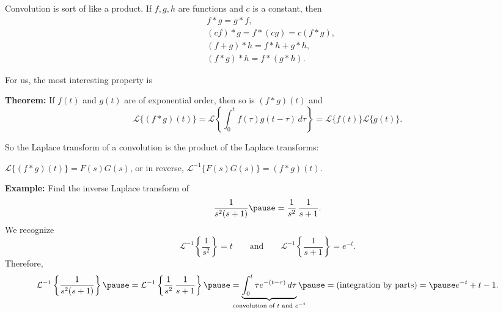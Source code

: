 \documentclass[10pt,aspectratio=169]{beamer}
\begin{document}
\begin{frame}
Convolution is sort of like a product.  If $f,g,h$ are functions and $c$
is a constant, then
\begin{align*}
& f * g = g * f , \\
& (c f) * g = f * (c g) = c (f*g) , \\
& (f+g) * h = f * h + g * h , \\
& ( f * g ) * h = f * ( g * h ) .
\end{align*}


\medskip
\pause

For us, the most
interesting property is

\medskip

\textbf{Theorem:}
If $f(t)$ and $g(t)$ are of exponential order, then
so is $(f*g)(t)$ and
\begin{equation*}
\mathcal{L} \bigl\{ (f*g)(t) \bigr\}
=
\mathcal{L} \left\{ \int_0^t f(\tau) g(t-\tau) \, d\tau \right\}
=
\mathcal{L} \bigl\{ f(t) \bigr\} \mathcal{L} \bigl\{ g(t) \bigr\} .
\end{equation*}

\medskip
\pause

So the Laplace transform of a convolution is the product
of the Laplace transforms:

\medskip
\qquad
${\mathcal{L}} \bigl\{ (f*g)(t) \bigr\} = F(s)G(s)$,
\pause
\qquad
or in reverse,
\qquad
${\mathcal{L}}^{-1} \bigl\{ F(s) G(s) \bigr\} = (f*g)(t)$.



\end{frame}

\begin{frame}
\textbf{Example:}
Find the inverse Laplace transform of
\[
\frac{1}{s^2 (s+1)} \pause = 
\frac{1}{s^2}
\,
\frac{1}{s+1}
.
\]
\pause
We recognize
\[
\mathcal{L}^{-1} 
\left\{
\frac{1}{s^2} \right\} 
= t
\qquad \text{and} \qquad
\mathcal{L}^{-1} 
\left\{
\frac{1}{s+1} \right\}
= e^{-t} .
\]
\pause
Therefore,
\[
\mathcal{L}^{-1}
\left\{
\frac{1}{s^2(s+1)}
\right\}
\pause
=
\mathcal{L}^{-1}
\left\{
\frac{1}{s^2}
\,
\frac{1}{s+1}
\right\}
\pause
=
\underbrace{
\int_0^t
\tau e^{-(t-\tau)} \,d\tau
}_{\mathclap{\text{convolution of } t \text{ and } e^{-t}}}
\pause
=
\text{(integration by parts)}
=
\pause
e^{-t}+t-1 .
\]

\end{frame}
\end{document}
